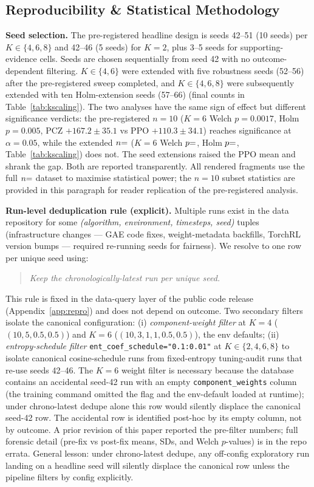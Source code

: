 \documentclass[11pt,a4paper]{article}
\DeclareRobustCommand{\cnum}[1]{\unskip}
\begin{document}
\subsection{Reproducibility \& Statistical Methodology}
\label{app:stats}

\textbf{Seed selection.} The pre-registered headline design is seeds 42--51 (10 seeds) per $K{\in}\{4,6,8\}$ and 42--46 (5 seeds) for $K{=}2$, plus 3--5 seeds for supporting-evidence cells. Seeds are chosen sequentially from seed 42 with no outcome-dependent filtering. $K{\in}\{4,6\}$ were extended with five robustness seeds (52--56) after the pre-registered sweep completed, and $K{\in}\{4,6,8\}$ were subsequently extended with ten Holm-extension seeds (57--66) (final counts in Table~\ref{tab:kscaling}). The two analyses have the same sign of effect but different significance verdicts: the pre-registered $n{=}10$ ($K{=}6$ Welch $p{=}0.0017$, Holm $p{=}0.005$, PCZ $+167.2{\pm}35.1$ vs PPO $+110.3{\pm}34.1$) reaches significance at $\alpha{=}0.05$, while the extended $n{=}\cnum{k6_pcz_seeds}$ ($K{=}6$ Welch $p{=}\cnum{k6_welch_p}$, Holm $p{=}\cnum{k6_holm_p}$, Table~\ref{tab:kscaling}) does not. The seed extensions raised the PPO mean and shrank the gap. Both are reported transparently. All rendered fragments use the full $n{=}\cnum{k6_pcz_seeds}$ dataset to maximise statistical power; the $n{=}10$ subset statistics are provided in this paragraph for reader replication of the pre-registered analysis.

\textbf{Run-level deduplication rule (explicit).} Multiple runs exist in the data repository for some \emph{(algorithm, environment, timesteps, seed)} tuples (infrastructure changes --- GAE code fixes, weight-metadata backfills, TorchRL version bumps --- required re-running seeds for fairness). We resolve to one row per unique seed using:
\begin{quote}
\emph{Keep the chronologically-latest run per unique seed.}
\end{quote}
This rule is fixed in the data-query layer of the public code release (Appendix~\ref{app:repro}) and does not depend on outcome. Two secondary filters isolate the canonical configuration: (i) \emph{component-weight filter} at $K{=}4$ ($(10,5,0.5,0.5)$) and $K{=}6$ ($(10,3,1,1,0.5,0.5)$), the env defaults; (ii) \emph{entropy-schedule filter} \texttt{ent\_coef\_schedule="0.1:0.01"} at $K{\in}\{2,4,6,8\}$ to isolate canonical cosine-schedule runs from fixed-entropy tuning-audit runs that re-use seeds 42--46. The $K{=}6$ weight filter is necessary because the database contains an accidental seed-42 run with an empty \texttt{component\_weights} column (the training command omitted the flag and the env-default loaded at runtime); under chrono-latest dedupe alone this row would silently displace the canonical seed-42 row. The accidental row is identified post-hoc by its empty column, not by outcome. A prior revision of this paper reported the pre-filter numbers; full forensic detail (pre-fix vs post-fix means, SDs, and Welch $p$-values) is in the repo errata. General lesson: under chrono-latest dedupe, any off-config exploratory run landing on a headline seed will silently displace the canonical row unless the pipeline filters by config explicitly.
\end{document}
